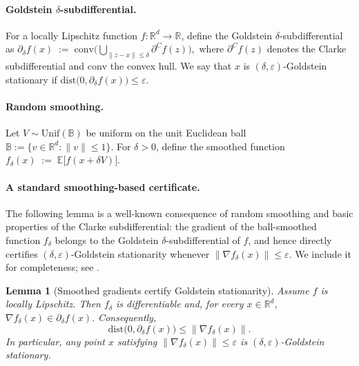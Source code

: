 \documentclass[11pt]{article}
\theoremstyle{plain}
\newtheorem{lemma}[theorem]{Lemma}
\theoremstyle{remark}
\newcommand{\R}{\mathbb{R}}
\newcommand{\E}{\mathbb{E}}
\newcommand{\1}{\mathbf{1}}
\begin{document}
\paragraph{Goldstein $\delta$-subdifferential.}
For a locally Lipschitz function $f:\R^d\to\R$, define the Goldstein $\delta$-subdifferential as
$
\partial_\delta f(x)
\;:=\;
\mathrm{conv}\Big(\bigcup_{\|z-x\|\le \delta} \partial^C f(z)\Big),
$
where $\partial^C f(z)$ denotes the Clarke subdifferential and $\mathrm{conv}$ the convex hull.
We say that $x$ is $(\delta,\varepsilon)$-Goldstein stationary if
$\mathrm{dist}\big(0,\partial_\delta f(x)\big)\le \varepsilon$.

\paragraph{Random smoothing.}
Let $V\sim \mathrm{Unif}(\mathbb B)$ be uniform on the unit Euclidean ball
$\mathbb B:=\{v\in\R^d:\|v\|\le 1\}$. For $\delta>0$, define the smoothed function
$
f_\delta(x)
\;:=\;
\E\big[f(x+\delta V)\big].
$

\paragraph{A standard smoothing-based certificate.}
The following lemma is a well-known consequence of random smoothing and basic properties of
the Clarke subdifferential: the gradient of the ball-smoothed function $f_\delta$ belongs to
the Goldstein $\delta$-subdifferential of $f$, and hence directly certifies
$(\delta,\varepsilon)$-Goldstein stationarity whenever $\|\nabla f_\delta(x)\|\le \varepsilon$.
We include it for completeness; see \cite{lin2022gradient}.
\begin{propbox}
\begin{lemma}[Smoothed gradients certify Goldstein stationarity]\label{lem:smoothing_bridge_goldstein}
Assume $f$ is locally Lipschitz. Then $f_\delta$ is differentiable and, for every $x\in\R^d$,
$
\nabla f_\delta(x)\in \partial_\delta f(x).
$
Consequently,
$$
\mathrm{dist}\big(0,\partial_\delta f(x)\big)\le \|\nabla f_\delta(x)\|.
$$
In particular, any point $x$ satisfying $\|\nabla f_\delta(x)\|\le \varepsilon$
is $(\delta,\varepsilon)$-Goldstein stationary.
\end{lemma}
\end{propbox}
\end{document}
